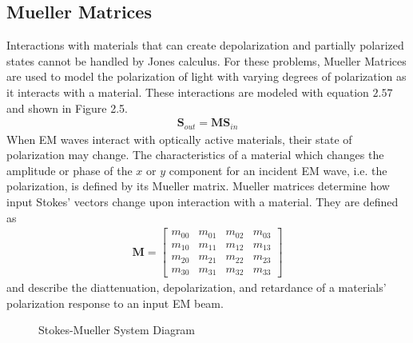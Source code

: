 \subsection{Mueller Matrices}
Interactions with materials that can create depolarization and partially polarized states cannot be handled by Jones calculus.  For these problems, Mueller Matrices are used to model the polarization of light with varying degrees of polarization as it interacts with a material.  These interactions are modeled with equation $2.57$ and shown in Figure 2.5.
\begin{align}
    \mathbf{S}_{out} = \mathbf{M}\mathbf{S}_{in}
\end{align}
%
When EM waves interact with optically active materials, their state of polarization may change.  The characteristics of a material which changes the amplitude or phase of the $x$ or $y$ component for an incident EM wave, i.e. the  polarization, is defined by its Mueller matrix.  Mueller matrices determine how input Stokes' vectors change upon interaction with a material. They are defined as
%
\begin{align}
    \mathbf{M} =
    \begin{bmatrix}
        m_{00} & m_{01} & m_{02} & m_{03} \\
        m_{10} & m_{11} & m_{12} & m_{13} \\
        m_{20} & m_{21} & m_{22} & m_{23} \\
        m_{30} & m_{31} & m_{32} & m_{33}
    \end{bmatrix}
\end{align}
%
and describe the diattenuation, depolarization, and retardance of a materials' polarization response to an input EM beam.
\begin{figure}
    \begin{center}
    \end{center}
    \caption{Stokes-Mueller System Diagram}
    \label{fig:polarization}
\end{figure}
